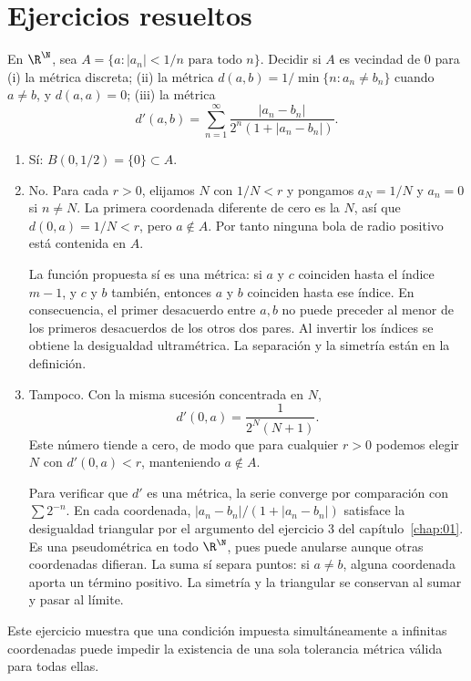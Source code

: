 \section{Ejercicios resueltos}
\begin{ejercicio}
En $\R^{\N}$, sea $A=\{a:|a_n|<1/n\text{ para todo }n\}$. Decidir si $A$ es vecindad de $0$ para (i) la métrica discreta; (ii) la métrica $d(a,b)=1/\min\{n:a_n\ne b_n\}$ cuando $a\ne b$, y $d(a,a)=0$; (iii) la métrica
\[
d'(a,b)=\sum_{n=1}^{\infty}\frac{|a_n-b_n|}{2^n(1+|a_n-b_n|)}.
\]
\end{ejercicio}
\begin{solucion}
\begin{enumerate}[label=(\roman*)]
\item Sí: $B(0,1/2)=\{0\}\subset A$.
\item No. Para cada $r>0$, elijamos $N$ con $1/N<r$ y pongamos $a_N=1/N$ y $a_n=0$ si $n\ne N$. La primera coordenada diferente de cero es la $N$, así que $d(0,a)=1/N<r$, pero $a\notin A$. Por tanto ninguna bola de radio positivo está contenida en $A$.

La función propuesta sí es una métrica: si $a$ y $c$ coinciden hasta el índice $m-1$, y $c$ y $b$ también, entonces $a$ y $b$ coinciden hasta ese índice. En consecuencia, el primer desacuerdo entre $a,b$ no puede preceder al menor de los primeros desacuerdos de los otros dos pares. Al invertir los índices se obtiene la desigualdad ultramétrica. La separación y la simetría están en la definición.
\item Tampoco. Con la misma sucesión concentrada en $N$,
\[
d'(0,a)=\frac{1}{2^N(N+1)}.
\]
Este número tiende a cero, de modo que para cualquier $r>0$ podemos elegir $N$ con $d'(0,a)<r$, manteniendo $a\notin A$.

Para verificar que $d'$ es una métrica, la serie converge por comparación con $\sum2^{-n}$. En cada coordenada, $|a_n-b_n|/(1+|a_n-b_n|)$ satisface la desigualdad triangular por el argumento del ejercicio 3 del capítulo~\ref{chap:01}. Es una pseudométrica en todo $\R^{\N}$, pues puede anularse aunque otras coordenadas difieran. La suma sí separa puntos: si $a\ne b$, alguna coordenada aporta un término positivo. La simetría y la triangular se conservan al sumar y pasar al límite.
\end{enumerate}
Este ejercicio muestra que una condición impuesta simultáneamente a infinitas coordenadas puede impedir la existencia de una sola tolerancia métrica válida para todas ellas.
\end{solucion}


